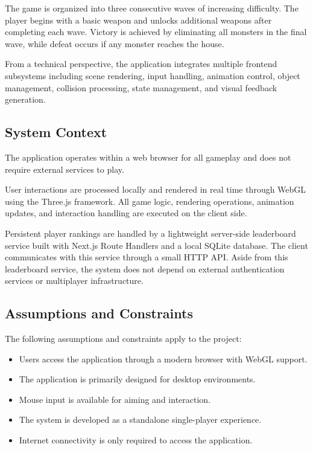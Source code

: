\documentclass[11pt,a4paper]{article}
\begin{document}
The game is organized into three consecutive waves of increasing difficulty. The
player begins with a basic weapon and unlocks additional weapons after
completing each wave. Victory is achieved by eliminating all monsters in the
final wave, while defeat occurs if any monster reaches the house.

From a technical perspective, the application integrates multiple frontend
subsystems including scene rendering, input handling, animation control, object
management, collision processing, state management, and visual feedback
generation.

\subsection{System Context}

The application operates within a web browser for all gameplay and does not
require external services to play.

User interactions are processed locally and rendered in real time through WebGL
using the Three.js framework. All game logic, rendering operations, animation
updates, and interaction handling are executed on the client side.

Persistent player rankings are handled by a lightweight server-side leaderboard
service built with Next.js Route Handlers and a local SQLite database. The
client communicates with this service through a small HTTP API. Aside from this
leaderboard service, the system does not depend on external authentication
services or multiplayer infrastructure.

\subsection{Assumptions and Constraints}

The following assumptions and constraints apply to the project:

\begin{itemize}
  \item Users access the application through a modern browser with WebGL support.
  \item The application is primarily designed for desktop environments.
  \item Mouse input is available for aiming and interaction.
  \item The system is developed as a standalone single-player experience.
  \item Internet connectivity is only required to access the application.
\end{itemize}
\end{document}
